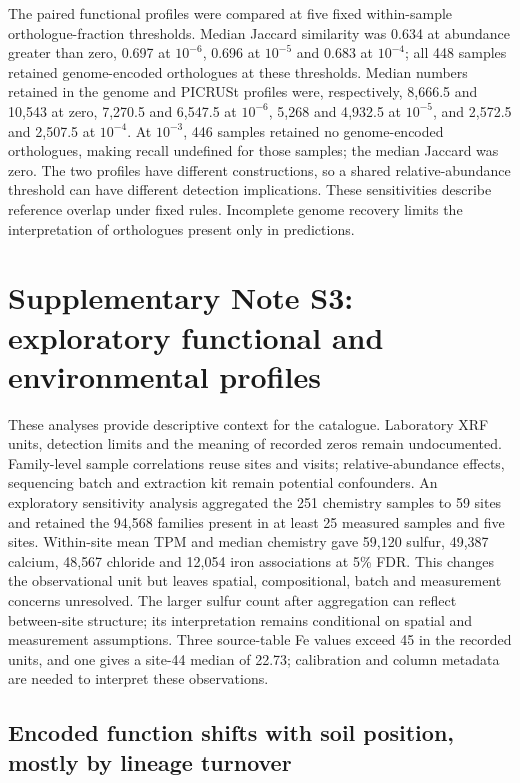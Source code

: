 \documentclass[11pt]{article}
\begin{document}
The paired functional profiles were compared at five fixed within-sample orthologue-fraction thresholds. Median Jaccard similarity was 0.634 at abundance greater than zero, 0.697 at $10^{-6}$, 0.696 at $10^{-5}$ and 0.683 at $10^{-4}$; all 448 samples retained genome-encoded orthologues at these thresholds. Median numbers retained in the genome and PICRUSt profiles were, respectively, 8{,}666.5 and 10{,}543 at zero, 7{,}270.5 and 6{,}547.5 at $10^{-6}$, 5{,}268 and 4{,}932.5 at $10^{-5}$, and 2{,}572.5 and 2{,}507.5 at $10^{-4}$. At $10^{-3}$, 446 samples retained no genome-encoded orthologues, making recall undefined for those samples; the median Jaccard was zero. The two profiles have different constructions, so a shared relative-abundance threshold can have different detection implications. These sensitivities describe reference overlap under fixed rules. Incomplete genome recovery limits the interpretation of orthologues present only in predictions.

\section*{Supplementary Note S3: exploratory functional and environmental profiles}
These analyses provide descriptive context for the catalogue. Laboratory XRF units, detection
limits and the meaning of recorded zeros remain undocumented. Family-level sample correlations
reuse sites and visits; relative-abundance effects, sequencing batch and extraction kit remain
potential confounders. An exploratory sensitivity analysis aggregated the 251 chemistry samples to 59 sites and retained the 94{,}568 families present in at least 25 measured samples and five sites. Within-site mean TPM and median chemistry gave 59{,}120 sulfur, 49{,}387 calcium, 48{,}567 chloride and 12{,}054 iron associations at 5\% FDR. This changes the observational unit but leaves spatial, compositional, batch and measurement concerns unresolved. The larger sulfur count after aggregation can reflect between-site structure; its interpretation remains conditional on spatial and measurement assumptions. Three source-table Fe values exceed 45 in the recorded units, and one gives a site-44 median of 22.73; calibration and column metadata are needed to interpret these observations.

\subsection*{Encoded function shifts with soil position, mostly by lineage turnover}
\end{document}
